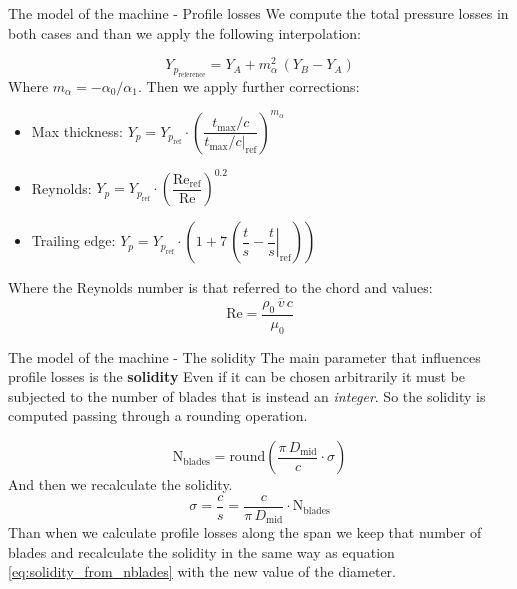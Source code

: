 \documentclass{beamer}
\newcommand{\myspaceneg}[0]{\vspace{-0.15cm}}
\newcommand{\dmid}{D_\text{mid}}
\newcommand{\highlightgreenC}[1]{\textcolor{chameleongreen3}{#1}}%
\begin{document}
\begin{frame}[t]{The model of the machine - Profile losses}
We compute the total pressure losses in both cases and than we apply the following interpolation:

\myspaceneg
\myspaceneg
\begin{equation}
Y_{p_\text{reference}} = Y_A + m_\alpha^2 \, ( Y_B - Y_A) 
\end{equation}
Where $m_\alpha = -\alpha_0 / \alpha_1$.
Then we apply further corrections:
\begin{center}
\begin{itemize}
	\item \begin{center} Max thickness: $Y_p = Y_{p_\text{ref}} \cdot \left( \dfrac{t_\text{max} / c}{t_\text{max} / c \vert_\text{ref}} \right) ^ {m_\alpha}$ \end{center}
	\item \begin{center} Reynolds: $Y_p = Y_{p_\text{ref}} \cdot \left( \dfrac{\text{Re}_\text{ref}}{\text{Re}} \right)^{\!0.2}$ \end{center}
	\item \begin{center} Trailing edge: $Y_p = Y_{p_\text{ref}} \cdot \left( 1 + 7\, \left(\dfrac{t}{s} - \left. \dfrac{t}{s} \right\vert _\text{ref} \right) \right)$ \end{center}
\end{itemize}
\end{center}
Where the Reynolds number is that referred to the chord and values:
\begin{equation}
\text{Re} = \dfrac{\rho_0\,\overline{v}\,c}{\mu_0}
\end{equation}
\end{frame}


\begin{frame}[t]{The model of the machine - The solidity}
The main parameter that influences profile losses is the \highlightgreenC{\textbf{solidity}}
Even if it can be chosen arbitrarily it must be subjected to the number of blades that is instead an \emph{integer}.
So the solidity is computed passing through a rounding operation.

\myspaceneg
\myspaceneg
\begin{equation}
\text{N}_\text{blades} = \text{round}\left( \dfrac{\pi\,\dmid}{c} \cdot \sigma  \right) 
\end{equation}
And then we recalculate the solidity.
\begin{equation}
\label{eq:solidity_from_nblades}
\sigma = \dfrac{c}{s} = \dfrac{c}{\pi\,\dmid} \cdot \text{N}_\text{blades}
\end{equation}
Than when we calculate profile losses along the span we keep that number of blades and recalculate 
the solidity in the same way as equation \ref{eq:solidity_from_nblades}
with the new value of the diameter.
\end{frame}
\end{document}
